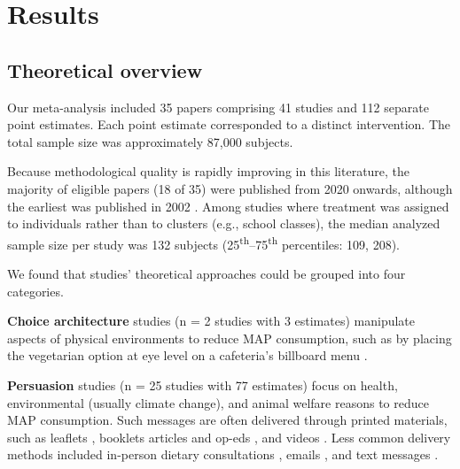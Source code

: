 \documentclass[preprint, 3p,
authoryear]{elsarticle} %
\begin{document}
\section{Results}\label{sec3}

\subsection{Theoretical overview}\label{sec3.1}

Our meta-analysis included 35 papers comprising 41 studies and 112
separate point estimates. Each point estimate corresponded to a distinct
intervention. The total sample size was approximately 87,000 subjects.

Because methodological quality is rapidly improving in this literature,
the majority of eligible papers (18 of 35) were published from 2020
onwards, although the earliest was published in 2002 \citep{allen2002}.
Among studies where treatment was assigned to individuals rather than to
clusters (e.g., school classes), the median analyzed sample size per
study was 132 subjects (25\textsuperscript{th}--75\textsuperscript{th}
percentiles: 109, 208).

We found that studies' theoretical approaches could be grouped into four
categories.

\textbf{Choice architecture} studies
\citep{andersson2021, kanchanachitra2020} (n = 2 studies with 3
estimates) manipulate aspects of physical environments to reduce MAP
consumption, such as by placing the vegetarian option at eye level on a
cafeteria's billboard menu \citep{andersson2021}.

\textbf{Persuasion} studies
\citep{kanchanachitra2020, aberman2018, abrahamse2007, acharya2004, banerjee2019, bianchi2022, bochmann2017, bschaden2020, carfora2023, hennessy2016, piester2020, cooney2014, cooney2016, feltz2022, haile2021, hatami2018, jalil2023, mathur2021effectiveness, merrill2009, norris2014, peacock2017, polanco2022, sparkman2021, weingarten2022}
(n = 25 studies with 77 estimates) focus on health, environmental
(usually climate change), and animal welfare reasons to reduce MAP
consumption. Such messages are often delivered through printed
materials, such as leaflets \citep{haile2021, polanco2022}, booklets
\citep{bianchi2022} articles and op-eds \citep{sparkman2021, feltz2022},
and videos \citep{sparkman2021, cooney2016, mathur2021effectiveness}.
Less common delivery methods included in-person dietary consultations
\citep{merrill2009}, emails \citep{banerjee2019}, and text messages
\citep{carfora2023}.
\end{document}
